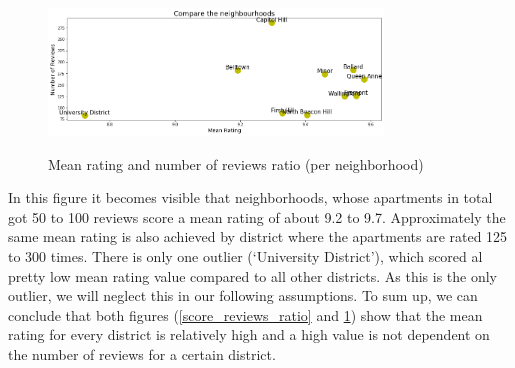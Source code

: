 \documentclass[journal]{IEEEtran}
\begin{document}
%
\begin{figure}
  \begin{center}
  \includegraphics[width=3.5in]{photo/2_2_compare_the_neighbourhoods.png}\\
  \caption{Mean rating and number of reviews ratio (per neighborhood)}\label{compare_the_neighbourhoods}
  \end{center}
\end{figure}
%
In this figure it becomes visible that neighborhoods, whose apartments in total got 50 to 100 reviews score a mean rating of about 9.2 to 9.7. Approximately the same mean rating is also achieved by district where the apartments are rated 125 to 300 times. There is only one outlier (‘University District’), which scored al pretty low mean rating value compared to all other districts. As this is the only outlier, we will neglect this in our following assumptions.
To sum up, we can conclude that both figures (\ref{score_reviews_ratio} and \ref{compare_the_neighbourhoods}) show that the mean rating for every district is relatively high and a high value is not dependent on the number of reviews for a certain district.
\end{document}
